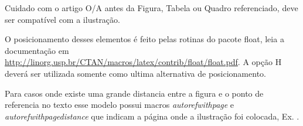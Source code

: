 Cuidado com o artigo O/A antes da Figura, Tabela ou Quadro referenciado, deve ser compatível com a ilustração.


O posicionamento desses elementos é feito pelas rotinas do pacote float, leia a documentação em  \url{http://linorg.usp.br/CTAN/macros/latex/contrib/float/float.pdf}. A opção H deverá ser utilizada somente como ultima alternativa de posicionamento.


Para casos onde existe uma grande distancia entre a figura e o ponto de referencia no texto esse modelo possui macros \emph{autorefwithpage} e \emph{autorefwithpagedistance} que indicam a página onde a ilustração foi colocada, Ex. .











